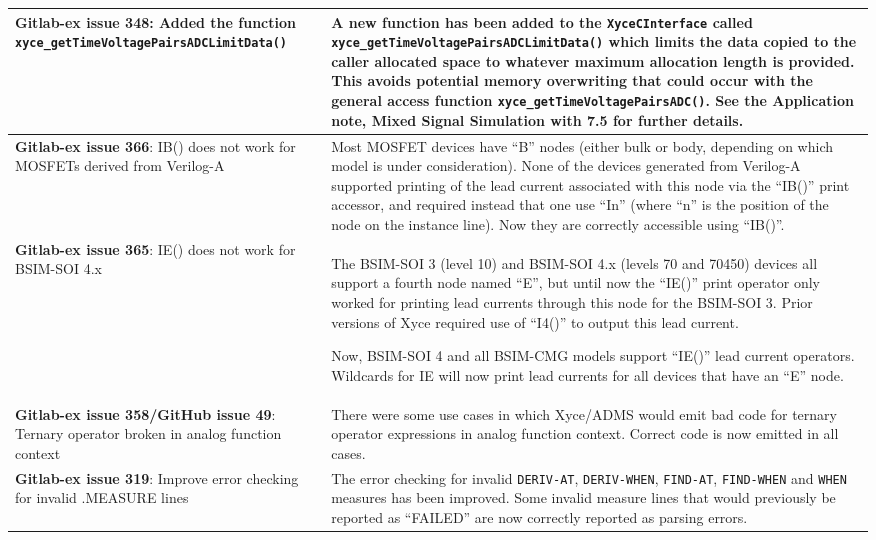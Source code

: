 {\begin{longtable}[h] {>{\raggedright\small}m{2in}|>{\raggedright\let\\\tabularnewline\small}m{3.5in}}
\textbf{Gitlab-ex issue 348}:  Added the function \texttt{xyce\_getTimeVoltagePairs\-ADCLimitData()}  &
  A new function has been added to the \texttt{XyceCInterface}
  called \texttt{xyce\_getTimeVoltagePairsADCLimitData()} which limits
  the data copied to the caller allocated space to whatever maximum
  allocation length is provided.  This avoids potential memory
  overwriting that could occur with the general access
  function \texttt{xyce\_getTimeVoltagePairsADC()}.  See the
  Application note, Mixed Signal Simulation with \Xyce{} 7.5 for
  further details.  \\ \hline

\textbf{Gitlab-ex issue 366}: IB() does not work for MOSFETs derived from Verilog-A
& Most MOSFET devices have ``B'' nodes (either bulk or body, depending
on which model is under consideration).  None of the devices generated
from Verilog-A supported printing of the lead current associated with
this node via the ``IB()'' print accessor, and required instead that
one use ``In'' (where ``n'' is the position of the node on the
instance line).  Now they are correctly accessible using ``IB()''. \\
\hline

\textbf{Gitlab-ex issue 365}: IE() does not work for BSIM-SOI 4.x
& The BSIM-SOI 3 (level 10) and BSIM-SOI 4.x (levels 70 and 70450)
devices all support a fourth node named ``E'', but until now the
``IE()'' print operator only worked for printing lead currents through
this node for the BSIM-SOI 3.  Prior versions of Xyce required use of
``I4()'' to output this lead current.

Now, BSIM-SOI 4 and all BSIM-CMG models support ``IE()'' lead current
operators.  Wildcards for IE will now print lead currents for all
devices that have an ``E'' node. \\ \hline

\textbf{Gitlab-ex issue 358/GitHub issue 49}: Ternary operator broken in
analog function context & There were some use cases in which Xyce/ADMS
would emit bad code for ternary operator expressions in analog
function context.  Correct code is now emitted in all
cases.  \\ \hline
\textbf{Gitlab-ex issue 319}:  Improve error checking for invalid
.MEASURE lines & The error checking for invalid \texttt{DERIV-AT},
\texttt{DERIV-WHEN}, \texttt{FIND-AT}, \texttt{FIND-WHEN} and
\texttt{WHEN} measures has been improved.  Some invalid measure
lines that would previously be reported as ``FAILED'' are now
correctly reported as parsing errors. \\ \hline


\end{longtable}}
